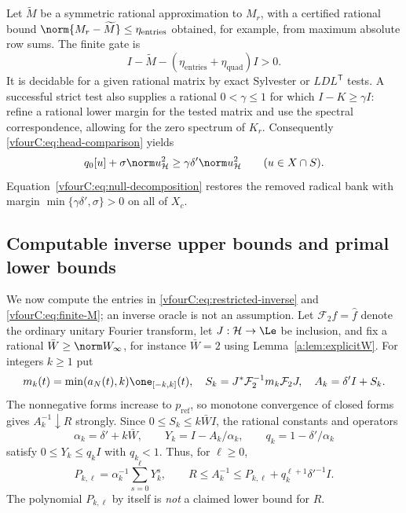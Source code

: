 \documentclass[11pt,a4paper]{article}
\numberwithin{equation}{section}
\theoremstyle{definition}\newtheorem{definition}[theorem]{Definition}
\theoremstyle{remark}\newtheorem{remark}[theorem]{Remark}
\newcommand{\Hh}{\mathcal H}\newcommand{\Hw}{\mathcal H}
\begin{document}
Let $\widetilde M$ be a symmetric rational approximation to $M_r$, with a
certified rational bound
$\norm{M_r-\widetilde M}\le\eta_{\mathrm{entries}}$ obtained, for example,
from maximum absolute row sums.  The finite gate is
\begin{equation}\label{vfourC:eq:gate}
 I-\widetilde M
       -(\eta_{\mathrm{entries}}+\eta_{\mathrm{quad}})I>0.
\end{equation}
It is decidable for a given rational matrix by exact Sylvester or
$LDL^{\mathsf T}$ tests.  A successful strict test also supplies a rational
$0<\gamma\le1$ for which $I-K\ge\gamma I$: refine a rational lower margin for
the tested matrix and use the spectral correspondence, allowing for the zero
spectrum of $K_r$.  Consequently \eqref{vfourC:eq:head-comparison} yields
\[
 q_0[u]+\sigma\norm u_{\Hh}^2
        \ge\gamma\delta'\norm u_{\Hh}^2\qquad(u\in X\cap S).
\]
Equation~\eqref{vfourC:eq:null-decomposition} restores the removed radical bank
with margin $\min\{\gamma\delta',\sigma\}>0$ on all of $X_c$.

\subsection{Computable inverse upper bounds and primal lower bounds}
\label{vfourC:subsec:inverse}

We now compute the entries in \eqref{vfourC:eq:restricted-inverse} and
\eqref{vfourC:eq:finite-M}; an inverse oracle is not an assumption.  Let
$\mathcal F_2f=\widehat f$ denote the ordinary unitary Fourier transform, let
$J:\Hh\to\Le$ be inclusion, and fix a rational
$\bar W\ge\norm W_\infty$, for instance $\bar W=2$ using
Lemma~\ref{a:lem:explicitW}.  For integers $k\ge1$ put
\[
 m_k(t)=\min(a_N(t),k)\one_{[-k,k]}(t),\quad
 S_k=J^*\mathcal F_2^{-1}m_k\mathcal F_2J,\quad A_k=\delta'I+S_k.
\]
The nonnegative forms increase to $p_{\mathrm{ref}}$, so monotone convergence
of closed forms gives $A_k^{-1}\downarrow R$ strongly.  Since
$0\le S_k\le k\bar W I$, the rational constants and operators
\[
 \alpha_k=\delta'+k\bar W,\qquad
 Y_k=I-A_k/\alpha_k,\qquad q_k=1-\delta'/\alpha_k
\]
satisfy $0\le Y_k\le q_k I$ with $q_k<1$.  Thus, for $\ell\ge0$,
\begin{equation}\label{vfourC:eq:inverse-upper}
 P_{k,\ell}=\alpha_k^{-1}\sum_{s=0}^{\ell}Y_k^s,
 \qquad
 R\le A_k^{-1}\le P_{k,\ell}
                  +q_k^{\ell+1}\delta'^{-1}I.
\end{equation}
The polynomial $P_{k,\ell}$ by itself is \emph{not} a claimed lower bound for
$R$.
\end{document}

